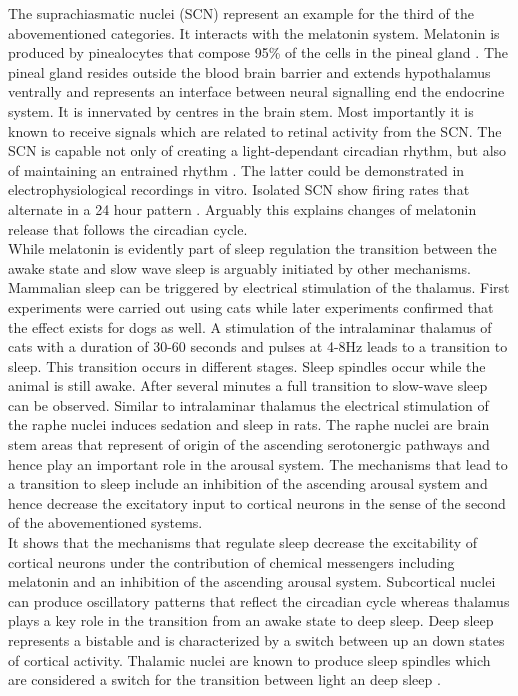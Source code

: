 The suprachiasmatic nuclei (SCN) represent an example for the third of the abovementioned categories. It interacts with the melatonin system. Melatonin is produced by pinealocytes that compose 95\% of the cells in the pineal gland \parencite{aulinas2019physiology}. The pineal gland resides outside the blood brain barrier and extends hypothalamus ventrally and represents an interface between neural signalling end the endocrine system. It is innervated by centres in the brain stem. Most importantly it is known to receive signals which are related to retinal activity from the SCN. The SCN is capable not only of creating a light-dependant circadian rhythm, but also of maintaining an entrained rhythm \parencite{koella1984organization}. The latter could be demonstrated in electrophysiological recordings in vitro. Isolated SCN show firing rates that alternate in a 24 hour pattern \parencite{de2011melatonergic}. Arguably this explains changes of melatonin release that follows the circadian cycle.\\
While melatonin is evidently part of sleep regulation the transition between the awake state and slow wave sleep is arguably initiated by other mechanisms. Mammalian sleep can be triggered by electrical stimulation of the thalamus. First experiments were carried out using cats while later experiments confirmed that the effect exists for dogs as well. A stimulation of the intralaminar thalamus of cats with a duration of 30-60 seconds and pulses at 4-8Hz leads to a transition to sleep. This transition occurs in different stages. Sleep spindles occur while the animal is still awake. After several minutes a full transition to slow-wave sleep can be observed. Similar to intralaminar thalamus the electrical stimulation of the raphe nuclei induces sedation and sleep in rats. The raphe nuclei are brain stem areas that represent of origin of the ascending serotonergic pathways and hence play an important role in the arousal system. The mechanisms that lead to a transition to sleep include an inhibition of the ascending arousal system and hence decrease the excitatory input to cortical neurons in the sense of the second of the abovementioned systems.\\
It shows that the mechanisms that regulate sleep decrease the excitability of cortical neurons under the contribution of chemical messengers including melatonin and an inhibition of the ascending arousal system. Subcortical nuclei can produce oscillatory patterns that reflect the circadian cycle whereas thalamus plays a key role in the transition from an awake state to deep sleep. Deep sleep represents a bistable and is characterized by a switch between up an down states of cortical activity. Thalamic nuclei are known to produce sleep spindles which are considered a switch for the transition between light an deep sleep \parencite{montagna2005fatal}.

